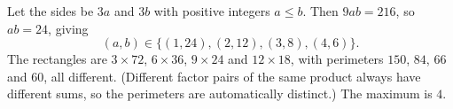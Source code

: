 Let the sides be $3a$ and $3b$ with positive integers $a\le b$. Then $9ab=216$, so $ab=24$, giving
\[
(a,b)\in\{(1,24),(2,12),(3,8),(4,6)\}.
\]
The rectangles are $3\times72$, $6\times36$, $9\times24$ and $12\times18$, with perimeters $150$, $84$, $66$ and $60$, all different. (Different factor pairs of the same product always have different sums, so the perimeters are automatically distinct.) The maximum is $\boxed{4}$.
